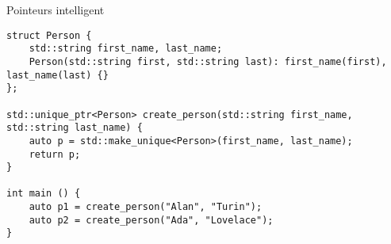 \documentclass[handout]{beamer}
\begin{document}
\begin{frame}[fragile]{Pointeurs intelligent}
\begin{lstlisting}
struct Person {
    std::string first_name, last_name;
    Person(std::string first, std::string last): first_name(first), last_name(last) {}
};

std::unique_ptr<Person> create_person(std::string first_name, std::string last_name) {
    auto p = std::make_unique<Person>(first_name, last_name);
    return p;
}

int main () {
    auto p1 = create_person("Alan", "Turin");
    auto p2 = create_person("Ada", "Lovelace");
}
\end{lstlisting}
\end{frame}
\end{document}
